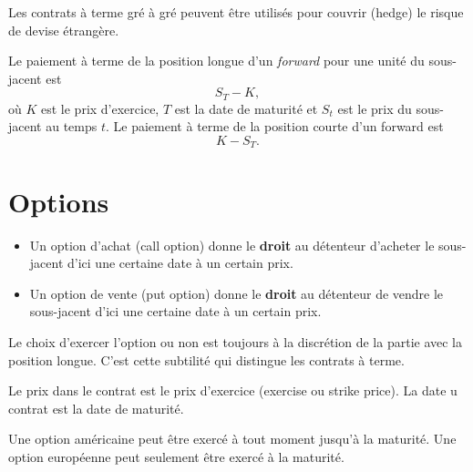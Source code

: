 Les contrats à terme gré à gré peuvent être utilisés pour couvrir (hedge) le risque de devise étrangère. 

Le paiement à terme de la position longue d'un \textit{forward} pour une unité du sous-jacent est $$S_T - K,$$ où $K$ est le prix d'exercice, $T$ est la date de maturité et $S_t$ est le prix du sous-jacent au temps $t$. Le paiement à terme de la position courte d'un forward est $$K - S_T.$$

\hfill 
{}

\section{Options}

\begin{definition}{}{}
	\begin{itemize}
		\item Un option d'achat (call option) donne le \textbf{droit} au détenteur d'acheter le sous-jacent d'ici une certaine date à un certain prix. 
		\item Un option de vente (put option) donne le \textbf{droit} au détenteur de vendre le sous-jacent d'ici une certaine date à un certain prix. 
	\end{itemize}
	Le choix d'exercer l'option ou non est toujours à la discrétion de la partie avec la position longue. C'est cette subtilité qui distingue les contrats à terme. 
	
	Le prix dans le contrat est le prix d'exercice (exercise ou strike price). La date u contrat est la date de maturité. 
	
	Une option américaine peut être exercé à tout moment jusqu'à la maturité. Une option européenne peut seulement être exercé à la maturité. 
\end{definition}


